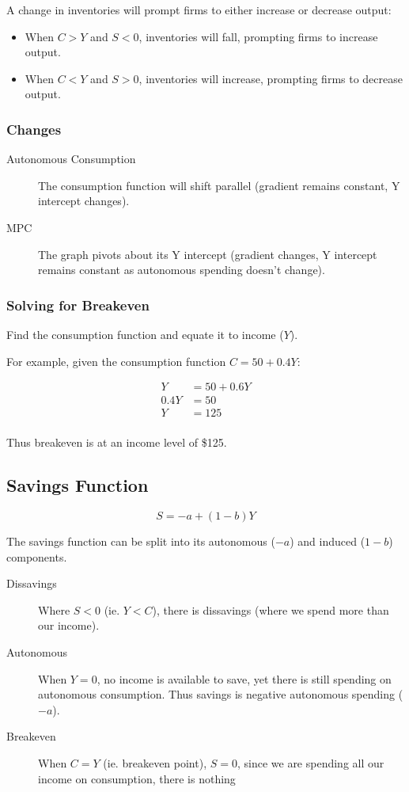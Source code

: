 \documentclass[a4paper,11pt]{report}
\begin{document}
A change in inventories will prompt firms to either increase or decrease
output:

\begin{itemize}
\item When $C > Y$ and $S < 0$, inventories will fall, prompting firms to
	increase output.
\item When $C < Y$ and $S > 0$, inventories will increase, prompting firms to
	decrease output.
\end{itemize}

\subsubsection{Changes}

\begin{description}
\item [Autonomous Consumption] The consumption function will shift parallel
	(gradient remains constant, Y intercept changes).
\item [MPC] The graph pivots about its Y intercept (gradient changes, Y
	intercept remains constant as autonomous spending doesn't change).
\end{description}

\subsubsection{Solving for Breakeven}

Find the consumption function and equate it to income ($Y$).

For example, given the consumption function $C = 50 + 0.4Y$:

$$
\begin{aligned}
Y & = 50 + 0.6Y \\
0.4Y & = 50 \\
Y & = 125 \\
\end{aligned}
$$

Thus breakeven is at an income level of \$125.

\subsection{Savings Function}

$$
S = -a + (1 - b)Y
$$

The savings function can be split into its autonomous ($-a$) and induced
($1 - b$) components.

\begin{description}
\item [Dissavings] Where $S < 0$ (ie. $Y < C$), there is dissavings (where we
	spend more than our income).
\item [Autonomous] When $Y = 0$, no income is available to save, yet there is
	still spending on autonomous consumption. Thus savings is negative autonomous
	spending ($-a$).
\item [Breakeven] When $C = Y$ (ie. breakeven point), $S = 0$, since we are
	spending all our income on consumption, there is nothing
\end{description}
\end{document}
